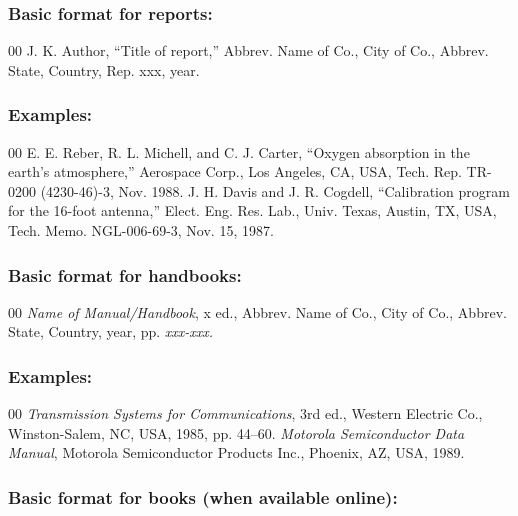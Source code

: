 \documentclass{ieeeojpel}
\begin{document}
\subsubsection*{Basic format for reports:}

\begin{thebibliography}{00}
 J. K. Author, ``Title of report,'' Abbrev. Name of Co., City of Co., Abbrev.
State, Country, Rep. {xxx}, year.
\end{thebibliography}

\subsubsection*{Examples:}

\begin{thebibliography}{00}
 E. E. Reber, R. L. Michell, and C. J. Carter, ``Oxygen absorption in the earth's atmosphere,'' Aerospace Corp., Los Angeles, CA, USA, Tech. Rep. TR-0200 (4230-46)-3, Nov. 1988.
 J. H. Davis and J. R. Cogdell, ``Calibration program for the 16-foot antenna,'' Elect. Eng. Res. Lab., Univ. Texas, Austin, TX, USA, Tech. Memo. NGL-006-69-3, Nov. 15, 1987.
\end{thebibliography}

\subsubsection*{Basic format for handbooks:}

\begin{thebibliography}{00}
 \textit{Name of Manual/Handbook}, x ed., Abbrev. Name of Co., City of Co., Abbrev. State, Country, year, pp.
\textit{xxx-xxx.}
\end{thebibliography}

\subsubsection*{Examples:}

\begin{thebibliography}{00}
 \textit{Transmission Systems for Communications}, 3rd ed., Western Electric Co., Winston-Salem, NC, USA, 1985, pp. 44--60.
 \textit{Motorola Semiconductor Data Manual}, Motorola Semiconductor Products Inc., Phoenix, AZ, USA, 1989.
\end{thebibliography}

\subsubsection*{Basic format for books (when available online): }
\end{document}
